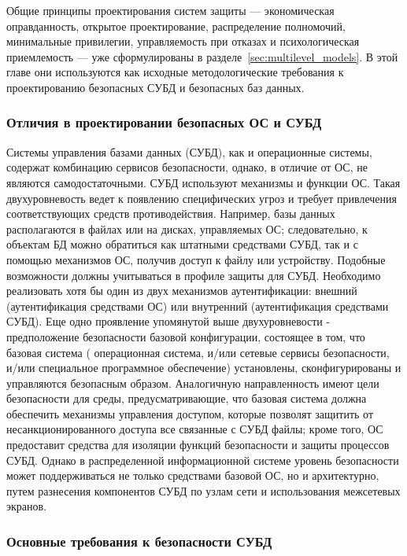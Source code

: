 Общие принципы проектирования систем защиты --- экономическая оправданность, открытое проектирование,
распределение полномочий, минимальные привилегии, управляемость при отказах и психологическая приемлемость ---
уже сформулированы в разделе~\ref{sec:multilevel_models}. В этой главе они используются как исходные
методологические требования к проектированию безопасных СУБД и безопасных баз данных.

\subsubsection{Отличия в проектировании безопасных ОС и СУБД}
Системы управления базами данных (СУБД), как и операционные системы, содержат комбинацию сервисов
безопасности, однако, в отличие от ОС, не являются самодостаточными. СУБД используют механизмы
и функции ОС. Такая двухуровневость ведет к появлению специфических угроз и требует привлечения
соответствующих средств противодействия. Например, базы данных располагаются в файлах или на дисках,
управляемых ОС; следовательно, к объектам БД можно обратиться как штатными средствами СУБД, так и с
помощью механизмов ОС, получив доступ к файлу или устройству.
Подобные возможности должны учитываться в профиле защиты для СУБД.
Необходимо реализовать хотя бы один из двух механизмов аутентификации: внешний (аутентификация средствами ОС)
или внутренний (аутентификация средствами СУБД).
Еще одно проявление упомянутой выше двухуровневости - предположение безопасности базовой конфигурации,
состоящее в том, что базовая система ( операционная система, и/или сетевые сервисы безопасности, и/или
специальное программное обеспечение) установлены, сконфигурированы и управляются безопасным образом.
Аналогичную направленность имеют цели безопасности для среды, предусматривающие, что базовая система
должна обеспечить механизмы управления доступом, которые позволят защитить от несанкционированного доступа
все связанные с СУБД файлы; кроме того, ОС предоставит средства для изоляции функций безопасности и защиты процессов СУБД.
Однако в распределенной информационной системе уровень безопасности может поддерживаться не только средствами базовой ОС,
но и архитектурно, путем разнесения компонентов СУБД по узлам сети и использования межсетевых экранов.

\subsubsection{Основные требования к безопасности СУБД}

